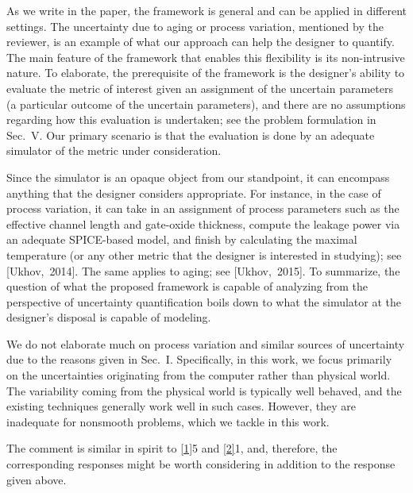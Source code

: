 \begin{authors}
As we write in the paper, the framework is general and can be applied in
different settings. The uncertainty due to aging or process variation, mentioned
by the reviewer, is an example of what our approach can help the designer to
quantify. The main feature of the framework that enables this flexibility is its
non-intrusive nature. To elaborate, the prerequisite of the framework is the
designer's ability to evaluate the metric of interest given an assignment of the
uncertain parameters (a particular outcome of the uncertain parameters), and
there are no assumptions regarding how this evaluation is undertaken; see the
problem formulation in Sec.~V. Our primary scenario is that the evaluation is
done by an adequate simulator of the metric under consideration.

Since the simulator is an opaque object from our standpoint, it can encompass
anything that the designer considers appropriate. For instance, in the case of
process variation, it can take in an assignment of process parameters such as
the effective channel length and gate-oxide thickness, compute the leakage power
via an adequate SPICE-based model, and finish by calculating the maximal
temperature (or any other metric that the designer is interested in studying);
see [Ukhov,~2014]. The same applies to aging; see [Ukhov,~2015]. To summarize,
the question of what the proposed framework is capable of analyzing from the
perspective of uncertainty quantification boils down to what the simulator at
the designer's disposal is capable of modeling.

We do not elaborate much on process variation and similar sources of uncertainty
due to the reasons given in Sec.~I. Specifically, in this work, we focus
primarily on the uncertainties originating from the computer rather than
physical world. The variability coming from the physical world is typically well
behaved, and the existing techniques generally work well in such cases. However,
they are inadequate for nonsmooth problems, which we tackle in this work.

The comment is similar in spirit to \cref{1}{5} and \cref{2}{1}, and, therefore,
the corresponding responses might be worth considering in addition to the
response given above.

\begin{actions}

\end{actions}
\end{authors}

